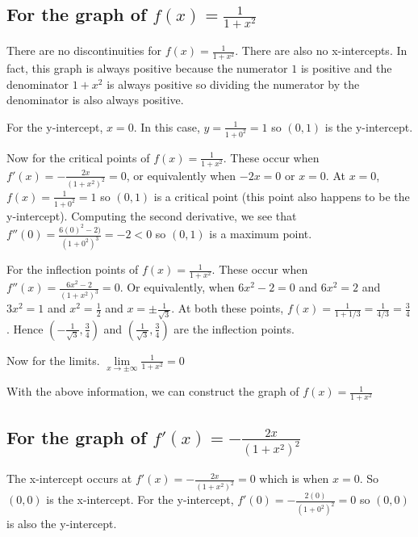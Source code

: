 \documentclass[9pt]{article}
\begin{document}
\subsection*{For the graph of $f(x) = \frac{1}{1 + x^2}$}

There are no discontinuities for $f(x) = \frac{1}{1 + x^2}$. There are also no x-intercepts. In fact, this graph is always positive because the numerator $1$ is positive and the denominator $1 + x^2$ is always positive so dividing the numerator by the denominator is also always positive.

For the y-intercept, $x = 0$. In this case, $y = \frac{1}{1 + 0^2} = 1$ so $(0, 1)$ is the y-intercept.

Now for the critical points of $f(x) = \frac{1}{1 + x^2}$. These occur when $f'(x) = -\frac{2x}{(1 + x^2)^2} = 0$, or equivalently when $-2x = 0$ or $x = 0$. At $x = 0$, $f(x) = \frac{1}{1 + 0^2} = 1$ so $(0, 1)$ is a critical point (this point also happens to be the y-intercept). Computing the second derivative, we see that $f''(0) = \frac{6(0)^2 - 2)}{(1 + 0^2)^3} = -2 < 0$ so $(0, 1)$ is a maximum point.

For the inflection points of $f(x) = \frac{1}{1 + x^2}$. These occur when $f''(x) = \frac{6x^2 - 2}{(1 + x^2)^3} = 0$. Or equivalently, when $6x^2 - 2 = 0$ and $6x^2 = 2$ and $3x^2 = 1$ and $x^2 = \frac{1}{2}$ and $x = \pm \frac{1}{\sqrt{3}}$. At both these points, $f(x) = \frac{1}{1 + 1/3} = \frac{1}{4/3} = \frac{3}{4}$. Hence $(-\frac{1}{\sqrt{3}}, \frac{3}{4})$ and $(\frac{1}{\sqrt{3}}, \frac{3}{4})$ are the inflection points.

Now for the limits. $\lim\limits_{x \rightarrow \pm\infty} \frac{1}{1 + x^2} = 0$

With the above information, we can construct the graph of $f(x) = \frac{1}{1 + x^2}$

\subsection*{For the graph of $f'(x) = -\frac{2x}{(1 + x^2)^2}$}

The x-intercept occurs at $f'(x) = -\frac{2x}{(1 + x^2)^2} = 0$ which is when $x = 0$. So $(0, 0)$ is the x-intercept. For the y-intercept, $f'(0) = -\frac{2(0)}{(1 + 0^2)^2} = 0$ so $(0, 0)$ is also the y-intercept.
\end{document}

